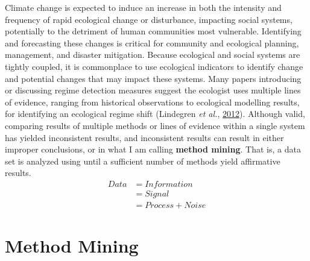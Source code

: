 \documentclass[print]{nuthesis}
\begin{document}
Climate change is expected to induce an increase in both the intensity and frequency of rapid ecological change or disturbance, impacting social systems, potentially to the detriment of human communities most vulnerable. Identifying and forecasting these changes is critical for community and ecological planning, management, and disaster mitigation. Because ecological and social systems are tightly coupled, it is commonplace to use ecological indicators to identify change and potential changes that may impact these systems. Many papers introducing or discussing regime detection measures suggest the ecologist uses multiple lines of evidence, ranging from historical observations to ecological modelling results, for identifying an ecological regime shift (Lindegren \emph{et al.}, \protect\hyperlink{ref-lindegren_early_2012}{2012}). Although valid, comparing results of multiple methods or lines of evidence within a single system has yielded inconsistent results, and inconsistent results can result in either improper conclusions, or in what I am calling \textbf{method mining}. That is, a data set is analyzed using until a sufficient number of methods yield affirmative results.
\begin{equation}
\begin{split}
Data  & = Information \\
& = Signal \\
& = Process + Noise
\end{split}
\label{eq:infoTheory}
\end{equation}
\hypertarget{method-mining}{%
\section{Method Mining}\label{method-mining}}
\end{document}
